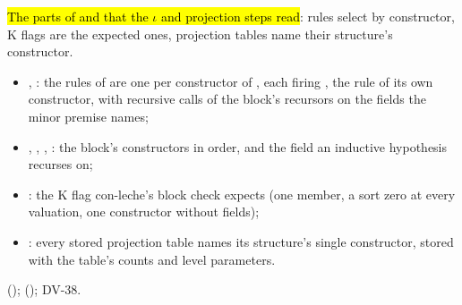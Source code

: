 \begin{definition}
  \label{def:EraseProof-RulesSelected}
  \leanok
   \hl{The parts of  and  that the $\iota$ and projection steps read}: rules select by constructor, K flags are the expected ones, projection tables name their structure's constructor.
  \begin{itemize}
  \item {}, : the rules of  are one per constructor of , each firing , the rule of its own constructor, with recursive calls of the block's recursors on the fields the minor premise names;
  \item {}, , , : the block's constructors in order, and the field an inductive hypothesis recurses on;
  \item {}: the K flag con-leche's block check expects (one member, a sort zero at every valuation, one constructor without fields);
  \item {}: every stored projection table names its structure's single constructor, stored with the table's counts and level parameters.
  \end{itemize}
    ();  (); DV-38.
\end{definition}


